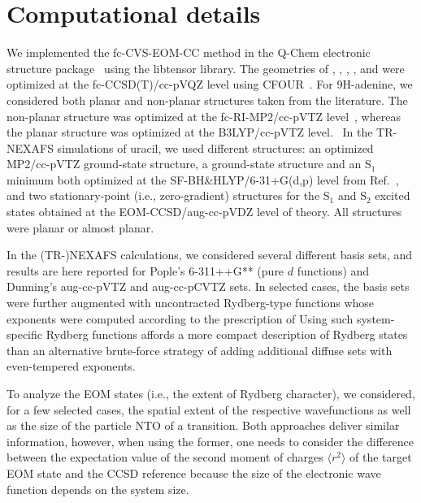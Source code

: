 \documentclass[journal=jctcce,manuscript=article]{achemso}
\begin{document}
\section{Computational details}
We implemented the fc-CVS-EOM-CC method in the Q-Chem electronic structure package~\cite{qchem_feature,Qchem_MP_paper} using
the libtensor library\cite{libtensor_paper}.
The geometries of , , , ,  and  were optimized at the fc-CCSD(T)/cc-pVQZ level using CFOUR~\cite{cfour}. For 9H-adenine, we considered 
both planar and non-planar structures taken from the literature. The non-planar structure was optimized at the
fc-RI-MP2/cc-pVTZ level~\cite{SarahMCD2018}, whereas the planar structure was optimized at the B3LYP/cc-pVTZ level.~\cite{Santoro2014}
In the TR-NEXAFS simulations of uracil, we used different structures: an optimized MP2/cc-pVTZ ground-state structure, a ground-state structure and an S$_1$
minimum
both optimized at the SF-BH\&HLYP/6-31+G(d,p) level from Ref.~, and two stationary-point (i.e., zero-gradient)
structures for the S$_1$ and S$_2$ excited states
obtained at the EOM-CCSD/aug-cc-pVDZ level of theory. 
All structures were planar or almost planar.

In the (TR-)NEXAFS calculations, we considered several different basis sets,
and results are here reported for 
Pople's 6-311++G** (pure $d$ functions) and Dunning's %
aug-cc-pVTZ and aug-cc-pCVTZ sets. In selected cases, the basis sets were further augmented with uncontracted Rydberg-type functions whose exponents were computed according to the prescription of \citeauthor{Rydberg_basis}\cite{Rydberg_basis}
Using such system-specific Rydberg functions affords a more compact description of Rydberg states than
an alternative brute-force strategy of adding additional diffuse sets with even-tempered exponents\cite{RydbergReview09}. 

To analyze the EOM states (i.e., the extent of Rydberg character), we considered, for a few selected cases, the spatial extent of the respective wavefunctions as well as the size of the particle NTO of a transition\cite{Mewes2018}.
Both approaches deliver similar information, however,
when using the former, one needs to consider the difference between the
expectation value of the second moment of charges $\langle r^2 \rangle$ of the target EOM state 
and the CCSD reference\cite{RydbergReview09}
because the size of the electronic wave function depends on the system size. 
\end{document}

